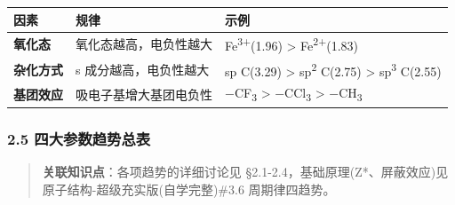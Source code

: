 {\def\LTcaptype{none} %
\begin{longtable}[]{@{}
  >{\raggedright\arraybackslash}p{}
  >{\raggedright\arraybackslash}p{}
  >{\raggedright\arraybackslash}p{}@{}}
\toprule\noalign{}
\begin{minipage}[b]{\linewidth}\raggedright
因素
\end{minipage} & \begin{minipage}[b]{\linewidth}\raggedright
规律
\end{minipage} & \begin{minipage}[b]{\linewidth}\raggedright
示例
\end{minipage} \\
\midrule\noalign{}
\endhead
\bottomrule\noalign{}
\endlastfoot
\textbf{氧化态} & 氧化态越高，电负性越大 & Fe\textsuperscript{3+}(1.96) \textgreater{} Fe\textsuperscript{2+}(1.83) \\
\textbf{杂化方式} & s 成分越高，电负性越大 & sp C(3.29) \textgreater{} sp\textsuperscript{2} C(2.75) \textgreater{} sp\textsuperscript{3} C(2.55) \\
\textbf{基团效应} & 吸电子基增大基团电负性 & −CF\textsubscript{3} \textgreater{} −CCl\textsubscript{3} \textgreater{} −CH\textsubscript{3} \\
\end{longtable}
}

\subsubsection{2.5 四大参数趋势总表}\label{ux56dbux5927ux53c2ux6570ux8d8bux52bfux603bux8868}

\begin{quote}
\textbf{关联知识点}：各项趋势的详细讨论见 §2.1-2.4，基础原理(Z*、屏蔽效应)见 原子结构-超级充实版(自学完整)\#3.6 周期律四趋势。
\end{quote}

